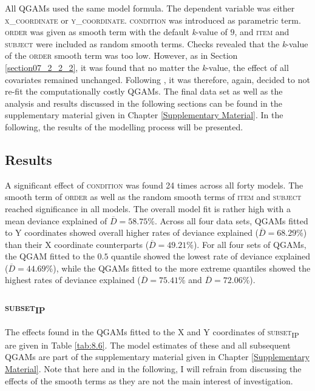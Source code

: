 All QGAMs used the same model formula. The dependent variable was either \textsc{x\_coordinate} or \textsc{y\_coordinate}. \textsc{condition} was introduced as parametric term. \textsc{order} was given as smooth term with the default \textit{k}-value of $9$, and \textsc{item} and \textsc{subject} were included as random smooth terms. Checks revealed that the \textit{k}-value of the \textsc{order} smooth term was too low. However, as in Section \ref{section07_2_2_2}, it was found that no matter the \textit{k}-value, the effect of all covariates remained unchanged. Following \citet{Wood2017}, it was therefore, again, decided to not re-fit the computationally costly QGAMs. The final data set as well as the analysis and results discussed in the following sections can be found in the supplementary material given in Chapter \ref{Supplementary Material}. In the following, the results of the modelling process will be presented.

\subsection{Results}\label{section08_2_2}

A significant effect of \textsc{condition} was found 24 times across all forty models. The smooth term of \textsc{order} as well as the random smooth terms of \textsc{item} and \textsc{subject} reached significance in all models. The overall model fit is rather high with a mean deviance explained of $\overline{D}=58.75$\%. Across all four data sets, QGAMs fitted to Y coordinates showed overall higher rates of deviance explained ($\overline{D}=68.29$\%) than their X coordinate counterparts ($\overline{D}=49.21$\%). For all four sets of QGAMs, the QGAM fitted to the $0.5$ quantile showed the lowest rate of deviance explained ($\overline{D}=44.69$\%), while the QGAMs fitted to the more extreme quantiles showed the highest rates of deviance explained ($\overline{D}=75.41$\% and $\overline{D}=72.06$\%).

\subsubsection{\textsc{subset\textsubscript{IP}}}\label{section08_2_2_1}

The effects found in the QGAMs fitted to the X and Y coordinates of \textsc{subset\textsubscript{IP}} are given in Table \ref{tab:8.6}. The model estimates of these and all subsequent QGAMs are part of the supplementary material given in Chapter \ref{Supplementary Material}. Note that here and in the following, I will refrain from discussing the effects of the smooth terms as they are not the main interest of investigation. 

